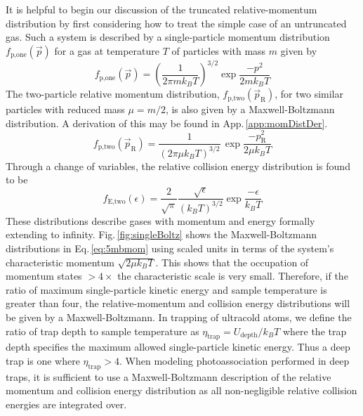 It is helpful to begin our discussion of the truncated relative-momentum distribution by first considering how to treat the simple case of an untruncated gas.
Such a system is described by a single-particle momentum distribution $f_\text{p,one}(\vec{p})$ for a gas at temperature $T$ of particles with mass $m$ given by 
\begin{equation}  \label{eq:5single_particle_prob}
		 f_\text{p,one}( \vec{p} ) = \left(\frac{1}{2 \pi m k_B T}\right)^{3/2} \exp{\frac{-p^2}{2 m k_B T}}
\end{equation}
The two-particle relative momentum distribution, $f_\text{p,two}(\vec{p}_\text{R})$, for two similar particles with reduced mass $\mu = m/2$, is also given by a Maxwell-Boltzmann distribution.
A derivation of this may be found in App.\,\ref{app:momDistDer}.
\begin{equation}
\label{eq:5mbmom}
	 f_\text{p,two}( \vec{p}_\text{R} ) = \frac{1}{\left( 2 \pi \mu k_B T \right)^{3/2}}\,\exp{\frac{-p_\text{R}^2}{2 \mu k_B T}}
\end{equation}
Through a change of variables, the relative collision energy distribution is found to be
\begin{equation} \label{eq:5mben}
	 f_\text{E,two}( \epsilon ) = \frac{2}{\sqrt{\pi}} \frac{\sqrt{\epsilon}}{(k_B T)^{3/2}} \exp{\frac{-\epsilon}{k_B T}}
\end{equation}
These distributions describe gases with momentum and energy formally extending to infinity.
Fig.\,\ref{fig:singleBoltz} shows the Maxwell-Boltzmann distributions in Eq.\,\ref{eq:5mbmom} using scaled units in terms of the system's characteristic momentum $\sqrt{2 \mu k_B T}$.
This shows that the occupation of momentum states $>\!4\!\times$ the characteristic scale is very small.
Therefore, if the ratio of maximum single-particle kinetic energy and sample temperature is greater than four, the relative-momentum and collision energy distributions will be given by a Maxwell-Boltzmann.
In trapping of ultracold atoms, we define the ratio of trap depth to sample temperature as $\eta_\text{trap} = U_\text{depth}/k_B T$ where the trap depth specifies the maximum allowed single-particle kinetic energy.
Thus a deep trap is one where $\eta_\text{trap} > 4$.
When modeling photoassociation performed in deep traps, it is sufficient to use a Maxwell-Boltzmann description of the relative momentum and collision energy distribution as all non-negligible relative collision energies are integrated over.

